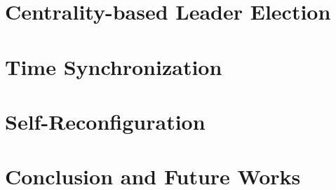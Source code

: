 \documentclass{beamer}
\begin{document}


\section{Centrality-based Leader Election}



\section{Time Synchronization}



\section{Self-Reconfiguration}



\section{Conclusion and Future Works}






\end{document}
